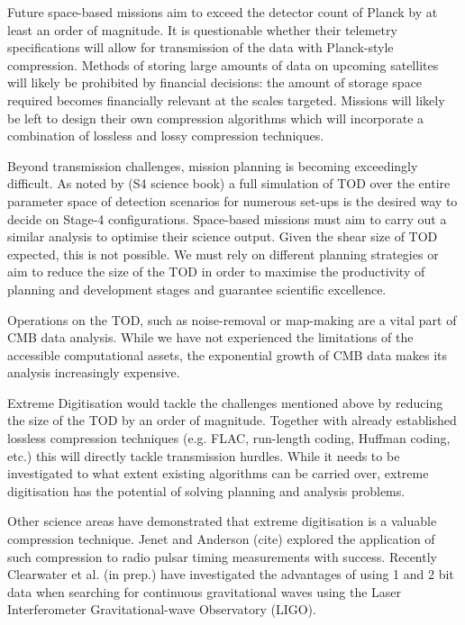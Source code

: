 \documentclass[apj]{emulateapj}
\begin{document}
Future space-based missions aim to exceed the detector count of Planck by at least an order of magnitude. It is questionable whether their telemetry specifications will allow for transmission of the data with Planck-style compression. Methods of storing large amounts of data on upcoming satellites will likely be prohibited by financial decisions: the amount of storage space required becomes financially relevant at the scales targeted. Missions will likely be left to design their own compression algorithms which will incorporate a combination of lossless and lossy compression techniques.


Beyond transmission challenges, mission planning is becoming exceedingly difficult. As noted by (S4 science book) a full simulation of TOD over the entire parameter space of detection scenarios for numerous set-ups is the desired way to decide on Stage-4 configurations. Space-based missions must aim to carry out a similar analysis to optimise their science output. Given the shear size of TOD expected, this is not possible. We must rely on different planning strategies or aim to reduce the size of the TOD in order to maximise the productivity of planning and development stages and guarantee scientific excellence.


Operations on the TOD, such as noise-removal or map-making are a vital part of CMB data analysis. While we have not experienced the limitations of the accessible computational assets, the exponential growth of CMB data makes its analysis increasingly expensive. 


Extreme Digitisation would tackle the challenges mentioned above by reducing the size of the TOD by an order of magnitude. Together with already established lossless compression techniques (e.g. FLAC, run-length coding, Huffman coding, etc.) this will directly tackle transmission hurdles. While it needs to be investigated to what extent existing algorithms can be carried over, extreme digitisation has the potential of solving planning and analysis problems.

Other science areas have demonstrated that extreme digitisation is a valuable compression technique. Jenet and Anderson (cite) explored the application of such compression to radio pulsar timing measurements with success. Recently Clearwater et al. (in prep.) have investigated the advantages of using 1 and 2 bit data when searching for continuous gravitational waves using the Laser Interferometer Gravitational-wave Observatory (LIGO).
\end{document}
